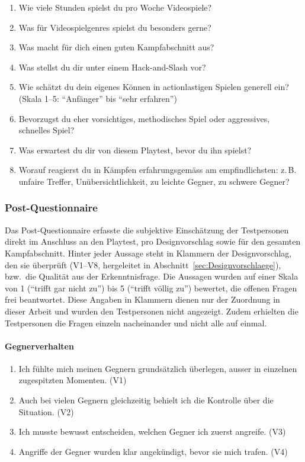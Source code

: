 \documentclass[../Main.tex]{subfiles}
\begin{document}
\begin{enumerate}[label=\textbf{P\arabic*}, leftmargin=1.5cm, itemsep=0.5em]
    \item Wie viele Stunden spielst du pro Woche Videospiele?
    \item Was für Videospielgenres spielst du besonders gerne?
    \item Was macht für dich einen guten Kampfabschnitt aus?
    \item Was stellst du dir unter einem Hack-and-Slash vor?
    \item Wie schätzt du dein eigenes Können in actionlastigen Spielen generell ein? (Skala 1--5: \enquote{Anfänger} bis \enquote{sehr erfahren})
    \item Bevorzugst du eher vorsichtiges, methodisches Spiel oder aggressives, schnelles Spiel?
    \item Was erwartest du dir von diesem Playtest, bevor du ihn spielst?
    \item Worauf reagierst du in Kämpfen erfahrungsgemäss am empfindlichsten: z.\,B. unfaire Treffer, Unübersichtlichkeit, zu leichte Gegner, zu schwere Gegner?
\end{enumerate}

\subsubsection{Post-Questionnaire} \label{sec:PostQuestionnaire}

Das Post-Questionnaire erfasste die subjektive Einschätzung der Testpersonen direkt im Anschluss an den Playtest, pro Designvorschlag sowie für den gesamten Kampfabschnitt. Hinter jeder Aussage steht in Klammern der Designvorschlag, den sie überprüft (V1--V8, hergeleitet in Abschnitt~\ref{sec:Designvorschlaege}), bzw.\ die Qualität aus der Erkenntnisfrage. Die Aussagen wurden auf einer Skala von 1 (\enquote{trifft gar nicht zu}) bis 5 (\enquote{trifft völlig zu}) bewertet, die offenen Fragen frei beantwortet. Diese Angaben in Klammern dienen nur der Zuordnung in dieser Arbeit und wurden den Testpersonen nicht angezeigt. Zudem erhielten die Testpersonen die Fragen einzeln nacheinander und nicht alle auf einmal.

\paragraph{Gegnerverhalten}
\begin{enumerate}[label=\textbf{Q\arabic*}, leftmargin=1.5cm, itemsep=0.5em]
    \item Ich fühlte mich meinen Gegnern grundsätzlich überlegen, ausser in einzelnen zugespitzten Momenten. \hfill (V1)
    \item Auch bei vielen Gegnern gleichzeitig behielt ich die Kontrolle über die Situation. \hfill (V2)
    \item Ich musste bewusst entscheiden, welchen Gegner ich zuerst angreife. \hfill (V3)
    \item Angriffe der Gegner wurden klar angekündigt, bevor sie mich trafen. \hfill (V4)
\end{enumerate}
\end{document}
